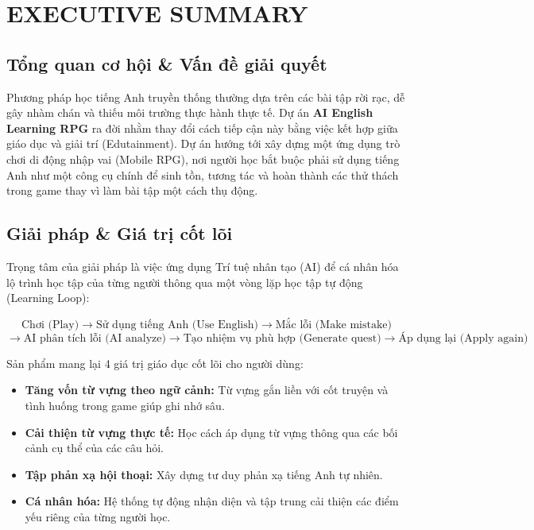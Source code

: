 \section{EXECUTIVE SUMMARY}

\subsection{Tổng quan cơ hội \& Vấn đề giải quyết}
Phương pháp học tiếng Anh truyền thống thường dựa trên các bài tập rời rạc, dễ gây nhàm chán và thiếu môi trường thực hành thực tế. Dự án \textbf{AI English Learning RPG} ra đời nhằm thay đổi cách tiếp cận này bằng việc kết hợp giữa giáo dục và giải trí (Edutainment). Dự án hướng tới xây dựng một ứng dụng trò chơi di động nhập vai (Mobile RPG), nơi người học bắt buộc phải sử dụng tiếng Anh như một công cụ chính để sinh tồn, tương tác và hoàn thành các thử thách trong game thay vì làm bài tập một cách thụ động.

\subsection{Giải pháp \& Giá trị cốt lõi}
Trọng tâm của giải pháp là việc ứng dụng Trí tuệ nhân tạo (AI) để cá nhân hóa lộ trình học tập của từng người thông qua một vòng lặp học tập tự động (Learning Loop):

$$\text{Chơi (Play)} \rightarrow \text{Sử dụng tiếng Anh (Use English)} \rightarrow \text{Mắc lỗi (Make mistake)}$$ 
$$\rightarrow \text{AI phân tích lỗi (AI analyze)} \rightarrow \text{Tạo nhiệm vụ phù hợp (Generate quest)} \rightarrow \text{Áp dụng lại (Apply again)}$$

\vspace{0.3cm}
Sản phẩm mang lại 4 giá trị giáo dục cốt lõi cho người dùng:
\begin{itemize}
    \item \textbf{Tăng vốn từ vựng theo ngữ cảnh:} Từ vựng gắn liền với cốt truyện và tình huống trong game giúp ghi nhớ sâu.
    \item \textbf{Cải thiện từ vựng thực tế:} Học cách áp dụng từ vựng thông qua các bối cảnh cụ thể của các câu hỏi.
    \item \textbf{Tập phản xạ hội thoại:} Xây dựng tư duy phản xạ tiếng Anh tự nhiên.
    \item \textbf{Cá nhân hóa:} Hệ thống tự động nhận diện và tập trung cải thiện các điểm yếu riêng của từng người học.
\end{itemize}


